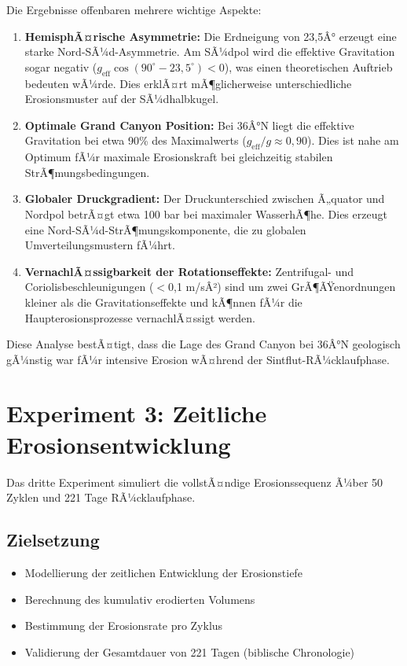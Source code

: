 ﻿\documentclass[12pt,a4paper]{report}
\begin{document}
Die Ergebnisse offenbaren mehrere wichtige Aspekte:

\begin{enumerate}
	\item \textbf{HemisphÃ¤rische Asymmetrie:} Die Erdneigung von 23,5Â° erzeugt eine starke Nord-SÃ¼d-Asymmetrie. Am SÃ¼dpol wird die effektive Gravitation sogar negativ ($g_{\text{eff}} \cos(90^\circ - 23{,}5^\circ) < 0$), was einen theoretischen \glqq Auftrieb\grqq{} bedeuten wÃ¼rde. Dies erklÃ¤rt mÃ¶glicherweise unterschiedliche Erosionsmuster auf der SÃ¼dhalbkugel.
	
	\item \textbf{Optimale Grand Canyon Position:} Bei 36Â°N liegt die effektive Gravitation bei etwa 90\% des Maximalwerts ($g_{\text{eff}}/g \approx 0{,}90$). Dies ist nahe am Optimum fÃ¼r maximale Erosionskraft bei gleichzeitig stabilen StrÃ¶mungsbedingungen.
	
	\item \textbf{Globaler Druckgradient:} Der Druckunterschied zwischen Ã„quator und Nordpol betrÃ¤gt etwa 100 bar bei maximaler WasserhÃ¶he. Dies erzeugt eine Nord-SÃ¼d-StrÃ¶mungskomponente, die zu globalen Umverteilungsmustern fÃ¼hrt.
	
	\item \textbf{VernachlÃ¤ssigbarkeit der Rotationseffekte:} Zentrifugal- und Coriolisbeschleunigungen ($<$0,1 m/sÂ²) sind um zwei GrÃ¶ÃŸenordnungen kleiner als die Gravitationseffekte und kÃ¶nnen fÃ¼r die Haupterosionsprozesse vernachlÃ¤ssigt werden.
\end{enumerate}

Diese Analyse bestÃ¤tigt, dass die Lage des Grand Canyon bei 36Â°N geologisch \glqq gÃ¼nstig\grqq{} war fÃ¼r intensive Erosion wÃ¤hrend der Sintflut-RÃ¼cklaufphase.

\section{Experiment 3: Zeitliche Erosionsentwicklung}

Das dritte Experiment simuliert die vollstÃ¤ndige Erosionssequenz Ã¼ber 50 Zyklen und 221 Tage RÃ¼cklaufphase.

\subsection{Zielsetzung}

\begin{itemize}
	\item Modellierung der zeitlichen Entwicklung der Erosionstiefe
	\item Berechnung des kumulativ erodierten Volumens
	\item Bestimmung der Erosionsrate pro Zyklus
	\item Validierung der Gesamtdauer von 221 Tagen (biblische Chronologie)
\end{itemize}
\end{document}
